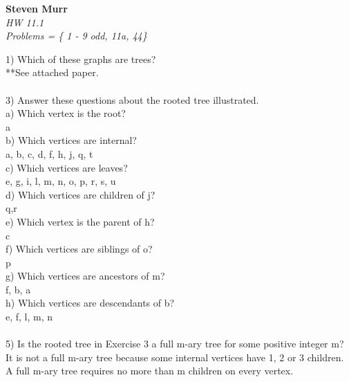 \documentclass{article}
\begin{document}
\setcounter{totalnumber}{5}
   \begin{flushright}
      \Large\textbf{Steven Murr}\\
      \large\textit{HW 11.1} \\
      \large\textit{ Problems = \{ 1 - 9 odd, 11a, 44\}}
   \end{flushright}
\begin{flushleft}
\makeatletter%
\setlength{\@fptop}{5pt}
\makeatother

\setlength\parindent{0pt}1) Which of these graphs are trees? \\
**See attached paper. \\
~\\
\setlength\parindent{0pt}3) Answer these questions about the rooted tree illustrated. \\
\setlength\parindent{24pt}a) Which vertex is the root? \\
\setlength\parindent{48pt} a \\
\setlength\parindent{24pt}b) Which vertices are internal? \\
\setlength\parindent{48pt} a, b, c, d, f, h, j, q, t \\
\setlength\parindent{24pt}c) Which vertices are leaves? \\
\setlength\parindent{48pt} e, g, i, l, m, n, o, p, r, s, u \\
\setlength\parindent{24pt}d) Which vertices are children of j? \\
\setlength\parindent{48pt} q,r \\
\setlength\parindent{24pt}e) Which vertex is the parent of h? \\
\setlength\parindent{48pt} c \\
\setlength\parindent{24pt}f) Which vertices are siblings of o? \\
\setlength\parindent{48pt} p \\
\setlength\parindent{24pt}g) Which vertices are ancestors of m? \\
\setlength\parindent{48pt} f, b, a \\
\setlength\parindent{24pt}h) Which vertices are descendants of b? \\
\setlength\parindent{48pt} e, f, l, m, n \\
~\\
\setlength\parindent{0pt}5) Is the rooted tree in Exercise 3 a full m-ary tree for some positive integer m? \\
\setlength\parindent{24pt} It is not a full m-ary tree because some internal vertices have 1, 2 or 3 children.  A full m-ary tree requires no more than m children on every vertex. \\

\end{flushleft}
\end{document}
